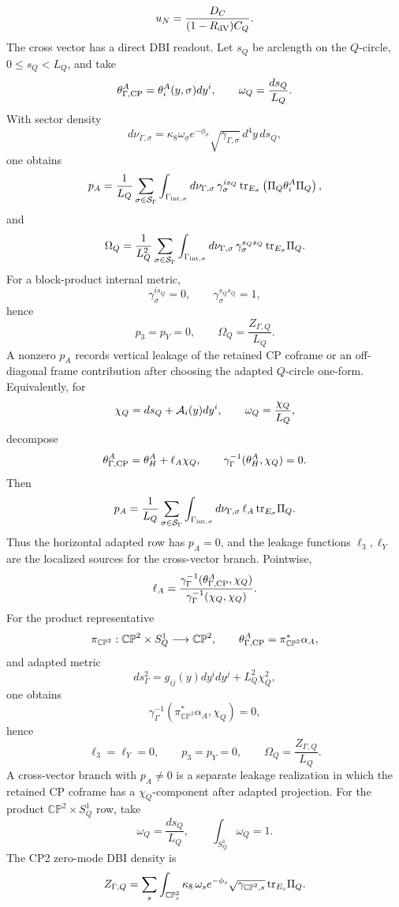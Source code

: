 \documentclass[11pt]{article}
\theoremstyle{definition}
\theoremstyle{remark}
\newcommand{\CP}{\mathbb{CP}}
\begin{document}
\[
  u_N=\frac{D_C}{(1-R_{\rm dV})C_Q}.
\]
The cross vector has a direct DBI readout.  Let \(s_Q\) be arclength on
the \(Q\)-circle, \(0\le s_Q<L_Q\), and take
\[
  \theta_{\Gamma,{\rm CP}}^A=\theta_i^A(y,\sigma)dy^i,
  \qquad
  \omega_Q=\frac{ds_Q}{L_Q}.
\]
With sector density
\[
  d\nu_{\Gamma,\sigma}
  =
  \kappa_8\omega_\sigma e^{-\phi_\sigma}
  \sqrt{\gamma_{\Gamma,\sigma}}\,
  d^4y\,ds_Q ,
\]
one obtains
\[
  p_A
  =
  \frac{1}{L_Q}
  \sum_{\sigma\in{\cal S}_\Gamma}
  \int_{\Gamma_{{\rm int},\sigma}}
  d\nu_{\Gamma,\sigma}\,
  \gamma_\sigma^{is_Q}\,
  {\rm tr}_{E_\sigma}
  \left(\Pi_Q\theta_i^A\Pi_Q\right),
\]
and
\[
  \Omega_Q
  =
  \frac{1}{L_Q^2}
  \sum_{\sigma\in{\cal S}_\Gamma}
  \int_{\Gamma_{{\rm int},\sigma}}
  d\nu_{\Gamma,\sigma}\,
  \gamma_\sigma^{s_Qs_Q}\,
  {\rm tr}_{E_\sigma}\Pi_Q .
\]
For a block-product internal metric,
\[
  \gamma_\sigma^{is_Q}=0,
  \qquad
  \gamma_\sigma^{s_Qs_Q}=1,
\]
hence
\[
  p_3=p_Y=0,
  \qquad
  \Omega_Q=\frac{Z_{\Gamma,Q}}{L_Q}.
\]
A nonzero \(p_A\) records vertical leakage of the retained CP coframe or an
off-diagonal frame contribution after choosing the adapted \(Q\)-circle
one-form.
Equivalently, for
\[
  \chi_Q=ds_Q+{\cal A}_i(y)dy^i,
  \qquad
  \omega_Q=\frac{\chi_Q}{L_Q},
\]
decompose
\[
  \theta_{\Gamma,{\rm CP}}^A
  =
  \theta_H^A+\ell_A\chi_Q,
  \qquad
  \gamma_\Gamma^{-1}(\theta_H^A,\chi_Q)=0 .
\]
Then
\[
  p_A
  =
  \frac{1}{L_Q}
  \sum_{\sigma\in{\cal S}_\Gamma}
  \int_{\Gamma_{{\rm int},\sigma}}
  d\nu_{\Gamma,\sigma}\,
  \ell_A\,
  {\rm tr}_{E_\sigma}\Pi_Q .
\]
Thus the horizontal adapted row has \(p_A=0\), and the leakage functions
\(\ell_3,\ell_Y\) are the localized sources for the cross-vector branch.
Pointwise,
\[
  \ell_A
  =
  \frac{\gamma_\Gamma^{-1}(\theta_{\Gamma,{\rm CP}}^A,\chi_Q)}
       {\gamma_\Gamma^{-1}(\chi_Q,\chi_Q)} .
\]
For the product representative
\[
  \pi_{\CP^2}:\CP^2\times S^1_Q\longrightarrow\CP^2,
  \qquad
  \theta_{\Gamma,{\rm CP}}^A=\pi_{\CP^2}^*\alpha_A,
\]
and adapted metric
\[
  ds_\Gamma^2=g_{ij}(y)dy^idy^j+L_Q^2\chi_Q^2,
\]
one obtains
\[
  \gamma_\Gamma^{-1}(\pi_{\CP^2}^*\alpha_A,\chi_Q)=0,
\]
hence
\[
  \ell_3=\ell_Y=0,
  \qquad
  p_3=p_Y=0,
  \qquad
  \Omega_Q=\frac{Z_{\Gamma,Q}}{L_Q}.
\]
A cross-vector branch with \(p_A\ne0\) is a separate leakage realization in
which the retained CP coframe has a \(\chi_Q\)-component after adapted
projection.
For the product \(\CP^2\times S^1_Q\) row, take
\[
  \omega_Q=\frac{ds_Q}{L_Q},
  \qquad
  \int_{S^1_Q}\omega_Q=1 .
\]
The CP2 zero-mode DBI density is
\[
  Z_{\Gamma,Q}
  =
  \sum_s\int_{\CP^2_s}
  \kappa_8\,\omega_s e^{-\phi_s}
  \sqrt{\gamma_{\CP^2,s}}\,
  {\rm tr}_{E_s}\Pi_Q .
\]
\end{document}
